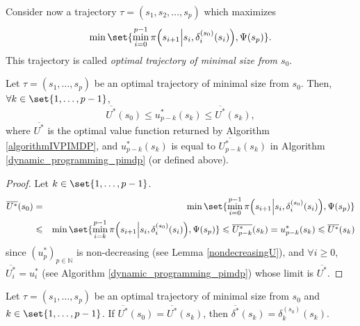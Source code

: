Consider now a trajectory 
$\tau=(s_1,s_2,\ldots,s_p)$ which maximizes 
\[ \min \set{ \min_{i=0}^{p-1} \pi \Big( s_{i+1} \Big\vert s_i, \delta^{(s_0)}_i(s_i) \Big), \Psi(s_p) }.\]
This trajectory is called \textit{optimal trajectory of minimal size from $s_0$}. 
\begin{Lemma} \label{stage1}
Let $\tau=(s_1,\ldots,s_p)$ be an optimal trajectory of minimal size from $s_0$.
Then, $\forall k \in \set{1,\ldots,p-1}$, 
\[ \overline{U^*}(s_0) \leqslant u^*_{p-k}(s_k) \leqslant \overline{U^*}(s_k), \]
where $\overline{U^*}$ is the optimal value function
returned by Algorithm \ref{algorithmIVPIMDP},
and $u^*_{p-k}(s_k)$ is equal to $\overline{U^*_{p-k}}(s_k)$
in Algorithm \ref{dynamic_programming_pimdp}
(or defined above).
\end{Lemma} 
\begin{proof}
Let $k \in \set{1,\ldots,p-1}$. 
\begin{eqnarray}
\nonumber \overline{U^*}(s_0) 
& = & \min \set{ \min_{i=0}^{p-1} \pi \Big( s_{i+1} \Big\vert s_i, \delta^{(s_0)}_i(s_i) \Big), \Psi(s_p) } \\
\nonumber & \leqslant & \min \set{ \min_{i=k}^{p-1} \pi \Big( s_{i+1} \Big\vert s_i, \delta^{(s_0)}_i(s_i) \Big), \Psi(s_p) } \leqslant \overline{U^*_{p-k}}(s_k) = u_{p-k}^*(s_k) \leqslant \overline{U^*}(s_k)
\end{eqnarray}
since $(u^*_p)_{p \in \mathbb{N}}$ is non-decreasing (see Lemma \ref{nondecreasingU}),
and $\forall i \geqslant 0$, $\overline{U^*_i} = u^*_i$ (see Algorithm \ref{dynamic_programming_pimdp}) whose limit is $\overline{U^*}$.
\end{proof}
\begin{Lemma} \label{stage2}
Let $\tau=(s_1,\ldots,s_p)$ be an optimal trajectory of minimal size from $s_0$ 
and $k \in \set{1,\ldots,p-1}$. 
If $\overline{U^*}(s_0) = \overline{U^*}(s_k)$, 
then $\overline{\delta^*}(s_k)=\delta^{(s_0)}_k(s_k)$.
\end{Lemma}
